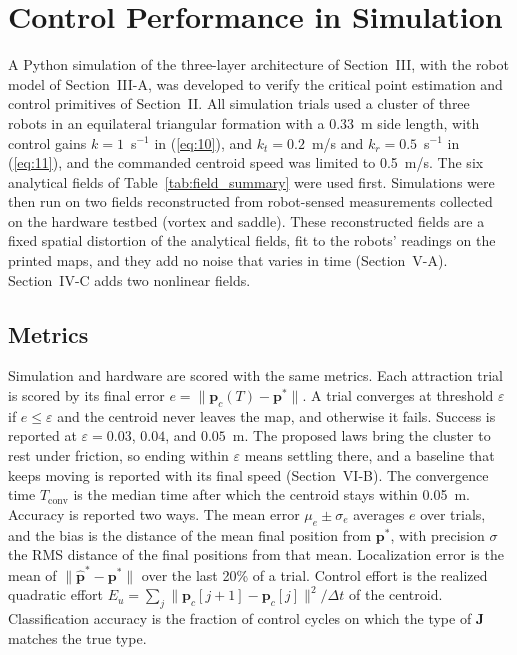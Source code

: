\documentclass[lettersize,journal]{IEEEtran}
\begin{document}
\section{Control Performance in Simulation}

A Python simulation of the three-layer architecture of Section~III, with the robot model of Section~III-A, was developed to verify the critical point estimation and control primitives of Section~II. All simulation trials used a cluster of three robots in an equilateral triangular formation with a 0.33~m side length, with control gains $k = 1$~s$^{-1}$ in (\ref{eq:10}), and $k_t = 0.2$~m/s and $k_r = 0.5$~s$^{-1}$ in (\ref{eq:11}), and the commanded centroid speed was limited to 0.5~m/s. The six analytical fields of Table~\ref{tab:field_summary} were used first. Simulations were then run on two fields reconstructed from robot-sensed measurements collected on the hardware testbed (vortex and saddle). These reconstructed fields are a fixed spatial distortion of the analytical fields, fit to the robots' readings on the printed maps, and they add no noise that varies in time (Section~V-A). Section~IV-C adds two nonlinear fields.

\subsection{Metrics}

Simulation and hardware are scored with the same metrics. Each attraction trial is scored by its final error $e = \|\mathbf{p}_c(T) - \mathbf{p}^*\|$. A trial converges at threshold $\varepsilon$ if $e \le \varepsilon$ and the centroid never leaves the map, and otherwise it fails. Success is reported at $\varepsilon = 0.03$, $0.04$, and $0.05$~m. The proposed laws bring the cluster to rest under friction, so ending within $\varepsilon$ means settling there, and a baseline that keeps moving is reported with its final speed (Section~VI-B). The convergence time $T_{\mathrm{conv}}$ is the median time after which the centroid stays within 0.05~m. Accuracy is reported two ways. The mean error $\mu_e \pm \sigma_e$ averages $e$ over trials, and the bias is the distance of the mean final position from $\mathbf{p}^*$, with precision $\sigma$ the RMS distance of the final positions from that mean. Localization error is the mean of $\|\hat{\mathbf{p}}^* - \mathbf{p}^*\|$ over the last 20\% of a trial. Control effort is the realized quadratic effort $E_u = \sum_j \|\mathbf{p}_c[j+1] - \mathbf{p}_c[j]\|^2/\Delta t$ of the centroid. Classification accuracy is the fraction of control cycles on which the type of $\hat{\mathbf{J}}$ matches the true type.
\end{document}
